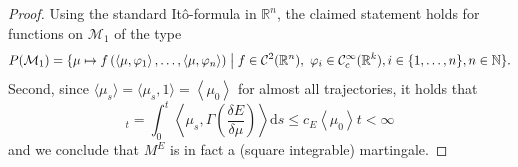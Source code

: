\documentclass{article}
\newcommand{\dd}{\text{d}}
\newcommand{\av}[1]{\left<#1\right>}
\newcommand{\R}{\mathbb{R}}
\newcommand{\N}{\mathbb{N}}
\newcommand{\C}{\mathcal C}
\newcommand{\cM}{\mathcal M}
\begin{document}
 \begin{proof} Using the standard It\^o-formula in $\R^n$, the claimed statement holds for functions on $\cM_1$
 of the type
 \begin{align*}
   P(\mathcal{M}_1) = \{\mu \mapsto f\left( \av{\mu, \varphi_1}, \dots, \av{\mu, \varphi_n} \right) \bigm| f \in \C^2(\R^n), ~\varphi_i \in \C_c^\infty(\R^k), i \in \{1, \dots, n\}, n \in \N\}.
 \end{align*}
 Second, since $\langle\mu_s\rangle =\langle\mu_s,1\rangle= \av{\mu_0}$ for almost all trajectories, it holds
 that
 \begin{equation*}
   [M^E_\cdot]_t = \int_0^t \av{\mu_s, \Gamma\left( \frac{\delta E}{\delta \mu} \right)} \dd s \leq c_E
   \av{\mu_0} t <\infty
 \end{equation*}
 and we conclude that $M^E$ is in fact a (square integrable) martingale.
         

\end{proof}
\end{document}
